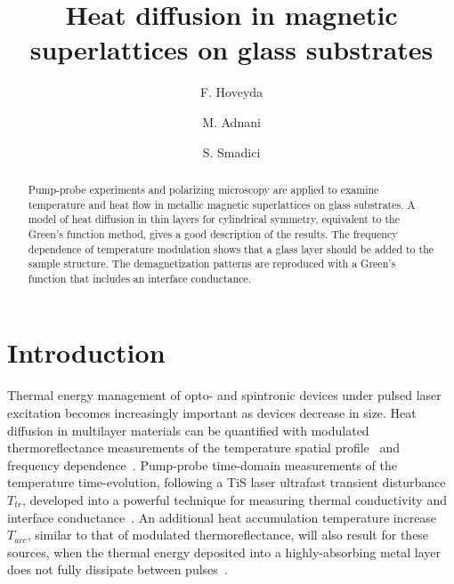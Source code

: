 \documentclass[5p]{elsarticle}
\begin{document}
\begin{frontmatter}

\title{Heat diffusion in magnetic superlattices on glass substrates}

\author{F. Hoveyda }

\author{M. Adnani }

\author{S. Smadici }



\address{Department of Physics and Astronomy, University of Louisville, KY 40292, USA}%

\begin{abstract}
Pump-probe experiments and polarizing microscopy are applied to examine temperature and heat flow in metallic magnetic superlattices on glass substrates. A model of heat diffusion in thin layers for cylindrical symmetry, equivalent to the Green's function method, gives a good description of the results. The frequency dependence of temperature modulation shows that a glass layer should be added to the sample structure. The demagnetization patterns are reproduced with a Green's function that includes an interface conductance.
\end{abstract}


\end{frontmatter}



\section{Introduction}

Thermal energy management of opto- and spintronic devices under pulsed laser excitation becomes increasingly important as devices decrease in size. Heat diffusion in multilayer materials can be quantified with modulated thermoreflectance measurements of the temperature spatial profile~\cite{2007Fretigny} and frequency dependence~\cite{1994Reichling}. Pump-probe time-domain measurements of the temperature time-evolution, following a TiS laser ultrafast transient disturbance $T_{tr}$, developed into a powerful technique for measuring thermal conductivity and interface conductance~\cite{2014Cahill}. An additional heat accumulation temperature increase $T_{acc}$, similar to that of modulated thermoreflectance, will also result for these sources, when the thermal energy deposited into a highly-absorbing metal layer does not fully dissipate between pulses~\cite{2008Schmidt-a,2008Schmidt-b}.
\end{document}
